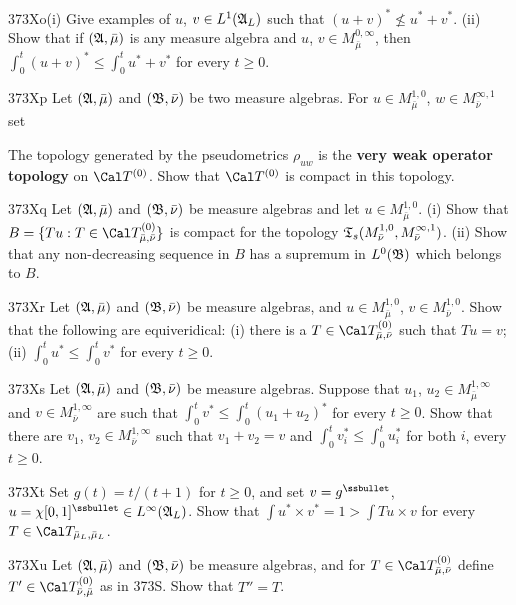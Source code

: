 {\spheader 373Xo(i) Give examples of $u$, $v\in L^1(\frak A_L)$ such
that $(u+v)^*\not\le u^*+v^*$.   (ii) Show that if $(\frak A,\bar\mu)$
is any measure algebra and $u$, $v\in M^{0,\infty}_{\bar\mu}$,
then $\int_0^t(u+v)^*\le\int_0^tu^*+v^*$ for every $t\ge 0$.
     
\spheader 373Xp Let $(\frak A,\bar\mu)$ and $(\frak B,\bar\nu)$ be two
measure algebras.   For $u\in M^{1,0}_{\bar\mu}$, $w\in
M^{\infty,1}_{\bar\nu}$ set
     
     
\noindent The topology generated
by the pseudometrics $\rho_{uw}$ is the {\bf very weak operator
topology} on $\Cal T^{(0)}$.   Show that $\Cal T^{(0)}$ is compact in
this topology.
     
\spheader 373Xq Let $(\frak A,\bar\mu)$ and $(\frak B,\bar\nu)$ be
measure algebras and let $u\in M^{1,0}_{\bar\mu}$.  (i) Show that
$B=\{Tu:T\in\Cal T^{(0)}_{\bar\mu,\bar\nu}\}$ is compact for the
topology $\frak T_s(M^{1,0}_{\bar\nu},M^{\infty,1}_{\bar\nu})$.
(ii) Show that any non-decreasing sequence in $B$ has a
supremum in $L^0(\frak B)$ which belongs to $B$.
     
\spheader 373Xr Let $(\frak A,\bar\mu)$ and $(\frak B,\bar\nu)$ be
measure algebras, and $u\in M^{1,0}_{\bar\mu}$, $v\in
M^{1,0}_{\bar\nu}$.
Show that the following are equiveridical:  (i) there is a
$T\in\Cal T^{(0)}_{\bar\mu,\bar\nu}$ such that $Tu=v$;  (ii)
$\int_0^tu^*\le\int_0^tv^*$ for every $t\ge 0$.
     
\spheader 373Xs Let $(\frak A,\bar\mu)$ and $(\frak B,\bar\nu)$ be
measure algebras.   Suppose that $u_1$, $u_2\in M^{1,\infty}_{\bar\mu}$
and $v\in M^{1,\infty}_{\bar\nu}$ are such that
$\int_0^tv^*\le\int_0^t(u_1+u_2)^*$
for every $t\ge 0$.   Show that there are $v_1$, $v_2\in
M^{1,\infty}_{\bar\nu}$ such that $v_1+v_2=v$ and
$\int_0^tv_i^*\le\int_0^tu_i^*$ for both $i$, every $t\ge 0$.
     
\sqheader 373Xt Set $g(t)=t/(t+1)$ for $t\ge 0$, and set
$v=g^{\ssbullet}$,
$u=\chi[0,1]^{\ssbullet}\in L^{\infty}(\frak A_L)$.   Show that $\int
u^*\times v^*=1>\int Tu\times v$ for every $T\in\Cal
T_{\bar\mu_L,\bar\mu_L}$.
     
\spheader 373Xu Let $(\frak A,\bar\mu)$ and $(\frak B,\bar\nu)$ be
measure algebras, and for $T\in\Cal T^{(0)}_{\bar\mu,\bar\nu}$ define
$T'\in\Cal T^{(0)}_{\bar\nu,\bar\mu}$ as in 373S.   Show that $T''=T$.
     
}

